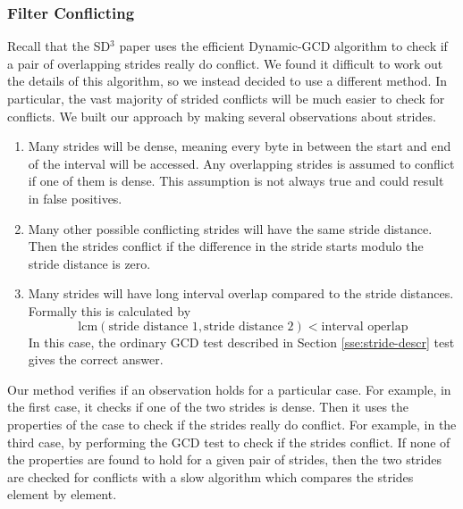 \documentclass[12pt,twoside]{reedthesis}
\begin{document}
		
		\subsubsection{Filter Conflicting}
		
			Recall that the SD$^3$ paper uses the efficient Dynamic-GCD algorithm to check if a pair of overlapping strides really do conflict. We found it difficult to work out the details of this algorithm, so we instead decided to use a different method. In particular, the vast majority of strided conflicts will be much easier to check for conflicts. We built our approach by making several observations about strides.
			
			\begin{enumerate}
				\item Many strides will be dense, meaning every byte in between the start and end of the interval will be accessed. Any overlapping strides is assumed to conflict if one of them is dense. This assumption is not always true and could result in false positives. 
				\item Many other possible conflicting strides will have the same stride distance. Then the strides conflict if the difference in the stride starts modulo the stride distance is zero. 
				\item Many strides will have long interval overlap compared to the stride distances. Formally this is calculated by $$\text{lcm}(\text{stride distance 1}, \text{stride distance 2}) < \text{interval operlap}$$ In this case, the ordinary GCD test described in Section \ref{sse:stride-descr} test gives the correct answer.
			\end{enumerate}
			Our method verifies if an observation holds for a particular case. For example, in the first case, it checks if one of the two strides is dense. Then it uses the properties of the case to check if the strides really do conflict. For example, in the third case, by performing the GCD test to check if the strides conflict. 
			If none of the properties are found to hold for a given pair of strides, then the two strides are checked for conflicts with a slow algorithm which compares the strides element by element.
			 
			
\end{document}
